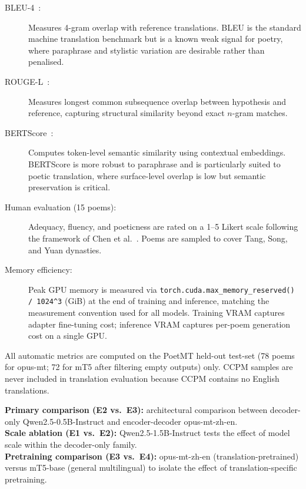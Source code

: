 \begin{description}
    \item[BLEU-4~\cite{papineni2002bleu}:]
    Measures 4-gram overlap with reference translations.
    BLEU is the standard machine translation benchmark but is a known
    weak signal for poetry, where paraphrase and stylistic variation
    are desirable rather than penalised.

    \item[ROUGE-L~\cite{lin2004rouge}:]
    Measures longest common subsequence overlap between hypothesis and
    reference, capturing structural similarity beyond exact $n$-gram
    matches.

    \item[BERTScore~\cite{zhang2019bertscore}:]
    Computes token-level semantic similarity using contextual
    embeddings.  BERTScore is more robust to paraphrase and is
    particularly suited to poetic translation, where surface-level
    overlap is low but semantic preservation is critical.

    \item[Human evaluation (15 poems):]
    Adequacy, fluency, and poeticness are rated on a 1--5 Likert scale
    following the framework of Chen et al.~\cite{chen2025benchmarking}.
    Poems are sampled to cover Tang, Song, and Yuan dynasties.

    \item[Memory efficiency:]
    Peak GPU memory is measured via \texttt{torch.cuda.max\_memory\_reserved() / 1024\^{}3} (GiB) at the end of training and inference, matching the measurement convention used for all models. Training VRAM captures adapter fine-tuning cost; inference VRAM captures per-poem generation cost on a single GPU.
\end{description}

    \noindent
    All automatic metrics are computed on the PoetMT held-out test-set
    (78 poems for opus-mt; 72 for mT5 after filtering empty outputs) only.
    CCPM samples are never included in
    translation evaluation because CCPM contains no English
    translations.\medskip

    \noindent
    \textbf{Primary comparison (E2 vs.\ E3):} architectural comparison between decoder-only Qwen2.5-0.5B-Instruct and encoder-decoder opus-mt-zh-en.\\
    \textbf{Scale ablation (E1 vs.\ E2):} Qwen2.5-1.5B-Instruct tests the effect of model scale within the decoder-only family.\\
    \textbf{Pretraining comparison (E3 vs.\ E4):} opus-mt-zh-en (translation-pretrained) versus mT5-base (general multilingual) to isolate the effect of translation-specific pretraining.

